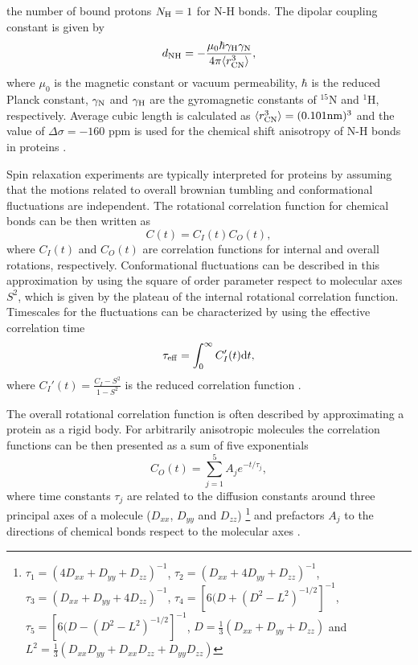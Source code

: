 \documentclass[pre,aps,floatfix,authordate1-4,twocolumn]{revtex4-1}
\begin{document}
the number of bound protons $N_{\rm{H}}=1$ for N-H bonds.
The dipolar coupling constant is given by
\begin{equation}
d_{\rm{NH}}=-\frac{\mu_0\hbar\gamma_{\rm{H}}\gamma_{\rm{N}}}{4\pi\langle r_{\rm{CN}}^3\rangle},\nonumber
\end{equation}
where $\mu_0$ is the magnetic constant or vacuum permeability, $\hbar$ is the reduced Planck constant,
$\gamma_{\rm{N}}$ and $\gamma_{\rm{H}}$ are the gyromagnetic constants of $^{15}$N and $^1$H, respectively.
Average cubic length is calculated as $\langle r_{\rm{CN}}^3\rangle = (0.101{\rm nm})^3$ and the 
value of $\Delta \sigma = -160$ ppm is used for the chemical shift anisotropy of N-H bonds in 
proteins \cite{kay89,hiyama88}.

Spin relaxation experiments are typically interpreted for proteins by
assuming that the motions related to overall brownian tumbling 
and conformational fluctuations are independent.
The rotational correlation function for chemical bonds can be then written
as  \cite{wennerstrom79,Lipari82,jarymowycz06,korzhnev01,halle09}
\begin{equation}\label{CORRFsep}
  C(t)=C_I(t)C_O(t),
\end{equation}
where $C_I(t)$ and $C_O(t)$ are correlation functions for internal and overall
rotations, respectively. Conformational fluctuations can be described
in this approximation by using the square of order parameter respect to 
molecular axes $S^2$, which is given by the plateau of the internal rotational 
correlation function. Timescales for the fluctuations can be characterized by
using the effective correlation time 
\begin{equation}\label{effCT}
  \tau_{\rm eff}=\int_0^\infty C_I'(t) \mathrm{d}t,
\end{equation}
where $C_I'(t)=\frac{C_I-S^2}{1-S^2}$ is the reduced correlation function \cite{Lipari82}.

The overall rotational correlation function is often described
by approximating a protein as a rigid body.
For arbitrarily anisotropic molecules the correlation functions
can  be then presented as a sum of five exponentials~\cite{woessner62,korzhnev01}
\begin{equation}\label{CORRFanisot}
  C_O(t)=\sum_{j=1}^5 A_j e^{-t/\tau_j},
\end{equation}
where time constants $\tau_j$ are related 
to the diffusion constants around
three principal axes of a molecule
($D_{xx}$, $D_{yy}$ and $D_{zz}$)  
\footnote{
$\tau_1=(4D_{xx}+D_{yy}+D_{zz})^{-1}$,
$\tau_2=(D_{xx}+4D_{yy}+D_{zz})^{-1}$,
$\tau_3=(D_{xx}+D_{yy}+4D_{zz})^{-1}$,
$\tau_4=[6(D+(D^2-L^2)^{-1/2}]^{-1}$,
$\tau_5=[6(D-(D^2-L^2)^{-1/2}]^{-1}$,
$D=\frac{1}{3}(D_{xx}+D_{yy}+D_{zz})$ and 
$L^2=\frac{1}{3}(D_{xx}D_{yy}+D_{xx}D_{zz}+D_{yy}D_{zz})$}
and prefactors $A_j$ to the directions of chemical bonds 
respect to the molecular axes \cite{woessner62,luginbuhl97}.
\end{document}
